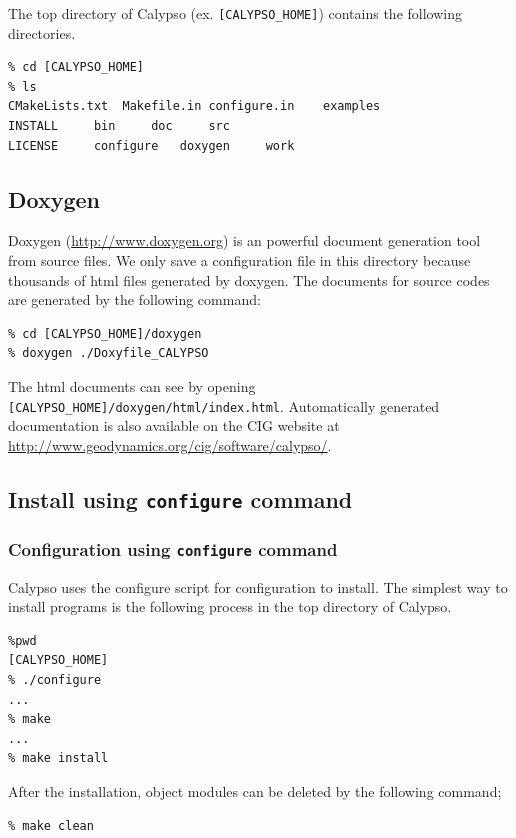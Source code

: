 The top directory of Calypso (ex. \verb|[CALYPSO_HOME]|) contains the following directories.
\begin{verbatim}
% cd [CALYPSO_HOME]
% ls
CMakeLists.txt	Makefile.in	configure.in	examples
INSTALL		bin		doc		src
LICENSE		configure	doxygen		work

\end{verbatim}


\subsection{Doxygen}
Doxygen (\url{http://www.doxygen.org}) is an powerful document generation tool from source files. We only save a configuration file in this directory because thousands of html files generated by doxygen. The documents for source codes are generated by the following command:
% 
\begin{verbatim}
% cd [CALYPSO_HOME]/doxygen
% doxygen ./Doxyfile_CALYPSO
\end{verbatim}
%
The html documents can see by opening \verb|[CALYPSO_HOME]/doxygen/html/index.html|.  Automatically generated documentation is also available on the CIG website at \url{http://www.geodynamics.org/cig/software/calypso/}.

\subsection{Install using {\tt configure} command }
\subsubsection{Configuration using {\tt configure} command }
Calypso uses the configure script for configuration to install. The simplest way to install programs is the following process in the top directory of Calypso.
% 
\begin{verbatim}
%pwd
[CALYPSO_HOME]
% ./configure
...
% make
...
% make install
\end{verbatim}
%
After the installation, object modules can be deleted by the following command;
% 
\begin{verbatim}
% make clean
\end{verbatim}
%


